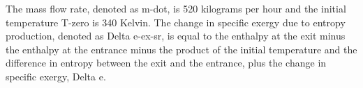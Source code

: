 The mass flow rate, denoted as m-dot, is 520 kilograms per hour and the initial temperature T-zero is 340 Kelvin. The change in specific exergy due to entropy production, denoted as Delta e-ex-sr, is equal to the enthalpy at the exit minus the enthalpy at the entrance minus the product of the initial temperature and the difference in entropy between the exit and the entrance, plus the change in specific exergy, Delta e.